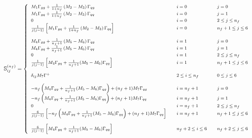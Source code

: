 \documentclass[10pt,a4paper]{article}
\begin{document}
\begin{equation}\label{eq:Smatrix}
\footnotesize
\mathbb{S}_{ij}^{(n_f)} =
\left\{
\begin{array}{lll}
M_1\Gamma_{gg}+\frac{1}{1+n_f}\left(M_2-M_3\right)\Gamma_{qg} &
                                                                      \quad i = 0 &\quad j = 0\\
M_1\Gamma_{gq}+\frac{1}{1+n_f}\left(M_2-M_3\right)\Gamma_{qq} & \quad i = 0 &\quad j =1\\
0 & \quad i = 0 &\quad  2\leq j \leq n_f\\
\frac1{j(j-1)}\left[M_1\Gamma_{gq}+\frac{1}{1+n_f}\left(M_2-M_3\right)\Gamma_{qq}\right] & \quad i = 0 &\quad  n_f+ 1\leq j \leq 6\\
\\
M_4\Gamma_{gg}+\frac{1}{n_f+1}\left(M_5-M_6\right)\Gamma_{qg} & \quad i = 1&\quad  j=0\\
M_4\Gamma_{gq}+\frac{1}{n_f+1}\left(M_5-M_6\right)\Gamma_{qq}& \quad i = 1 &\quad  j=1\\
0 & \quad i = 1 &\quad  2\leq j \leq n_f\\
\frac{1}{j(j-1)}\left[M_4\Gamma_{gq}+\frac{1}{n_f+1}(M_5-M_6)\Gamma_{qq}\right] & \quad i = 1 &\quad  n_f+1\leq j\leq 6\\
\\
\delta_{ij}M_7\Gamma^+&\quad 2\leq i \leq n_f &\quad 0\leq j
                                                         \leq 6\\
\\
-n_f\left(M_4\Gamma_{gg}+\frac{1}{n_f+1}(M_5-M_6)\Gamma_{qg}\right)+(n_f+1)M_7\Gamma_{qg}&\quad i = n_f+1 &\quad j =0\\
-n_f\left(M_4\Gamma_{gq}+\frac{1}{n_f+1}(M_5-M_6)\Gamma_{qq}\right)+(n_f+1)M_7\Gamma_{qq}&\quad i = n_f+1 &\quad j =1\\
0 & \quad i = n_f+1 &\quad  2\leq j \leq n_f\\
  \frac{6}{j(j-1)}\left[-n_f\left(M_4\Gamma_{gq}+\frac{1}{n_f+1}(M_5-M_6)\Gamma_{qq}\right)+(n_f+1)M_7\Gamma_{qq}\right]
&\quad i = n_f+1 &\quad n_f+1 \leq j \leq 6\\
\\
  \frac{6}{j(j-1)}\left[M_4\Gamma_{gq}+\frac{1}{n_f+1}(M_5-M_6)\Gamma_{qq} \right]
& \quad n_f+2\leq i \leq 6 &\quad  n_f+
                                                            2\leq j
                                                            \leq 6\\
\end{array}
\right.
\end{equation}
\end{document}

